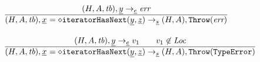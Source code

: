 \[\begin{array}{l@{~~}l@{~~}ll}
\frac{\begin{matrix}
\evale, \ir{y} \rightarrow_{\ir\expr} \err
\end{matrix}}{\begin{matrix}
\state, \irid \ {\tt = {\diamond}iteratorHasNext}(\ir{y}, \ir{z})  \rightarrow_{\ir\stmt} \res, \error
\end{matrix}}
\\[2em]

\frac{\begin{matrix}
\evale, \ir{y} \rightarrow_{\ir\expr} v_1
\rulesep
v_1\not\in\Loc
\end{matrix}}{\begin{matrix}
\state, \irid \ {\tt = {\diamond}iteratorHasNext}(\ir{y}, \ir{z})  \rightarrow_{\ir\stmt} \res, \thte
\end{matrix}}
\\[2em]


\end{array}
\]


